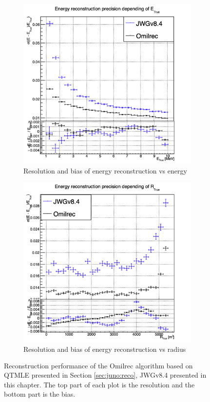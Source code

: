 \documentclass[../main.tex]{subfiles}
\begin{document}
\begin{figure}[ht]
  \centering
  \begin{subfigure}[t]{0.48\linewidth}
    \centering
    \includegraphics[width=\linewidth]{images/jgnn/MESBvET_nox.png}
    \caption{Resolution and bias of energy reconstruction vs energy}
    \label{fig:jgnn:MESBvETC_nox}
  \end{subfigure}
  \begin{subfigure}[t]{0.48\linewidth}
    \centering
    \includegraphics[width=\linewidth]{images/jgnn/MESBvRT_nox.png}
    \caption{Resolution and bias of energy reconstruction vs radius}
    \label{fig:jgnn:MESBvRTC_nox}
  \end{subfigure}
  \caption{Reconstruction performance of the Omilrec algorithm based on QTMLE presented in Section \ref{sec:juno:reco}, JWGv8.4 presented in this chapter. The top part of each plot is the resolution and the bottom part is the bias.}
  \label{fig:jgnn:results_nox_1}
\end{figure}
\end{document}
